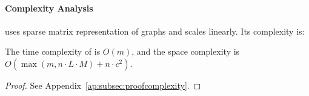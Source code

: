 
\paragraph{Complexity Analysis}
\methodexp uses sparse matrix representation of graphs and scales linearly. 
Its complexity is:
\begin{lemma} \label{lem:complexity}
The time complexity of \methodexp is $O(m)$,
and the space complexity is $O(\max{(m, n \cdot L \cdot M)} + n \cdot c^{2})$.
\end{lemma}
\begin{proof}
See Appendix~\ref{ap:subsec:proofcomplexity}.
\end{proof}